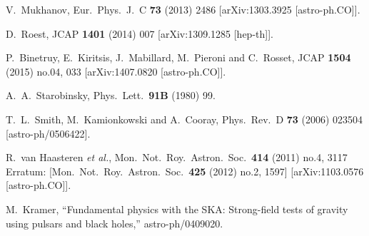 \begin{thebibliography}{10}
  V.~Mukhanov,
  Eur.\ Phys.\ J.\ C {\bf 73} (2013) 2486
  [arXiv:1303.3925 [astro-ph.CO]].


  D.~Roest,
  JCAP {\bf 1401} (2014) 007
  [arXiv:1309.1285 [hep-th]].


  P.~Binetruy, E.~Kiritsis, J.~Mabillard, M.~Pieroni and C.~Rosset,
  JCAP {\bf 1504} (2015) no.04,  033
  [arXiv:1407.0820 [astro-ph.CO]].


  A.~A.~Starobinsky,
  Phys.\ Lett.\  {\bf 91B} (1980) 99.


  T.~L.~Smith, M.~Kamionkowski and A.~Cooray,
  Phys.\ Rev.\ D {\bf 73} (2006) 023504
  [astro-ph/0506422].


  R.~van Haasteren {\it et al.},
  Mon.\ Not.\ Roy.\ Astron.\ Soc.\  {\bf 414} (2011) no.4,  3117
   Erratum: [Mon.\ Not.\ Roy.\ Astron.\ Soc.\  {\bf 425} (2012) no.2,  1597]
  [arXiv:1103.0576 [astro-ph.CO]].


  M.~Kramer, 
  ``Fundamental physics with the SKA: Strong-field tests of gravity using pulsars and black holes,''
  astro-ph/0409020.



\end{thebibliography}
